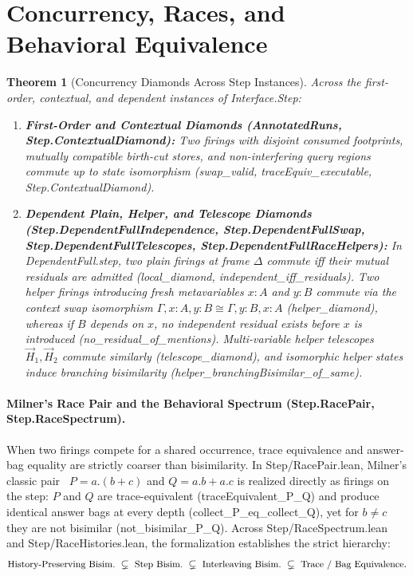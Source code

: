 \documentclass[11pt,a4paper]{article}
\newtheorem{theorem}{Theorem}[section]
\theoremstyle{definition}
\DeclareRobustCommand{\lean}[1]{%
  \ifmmode\text{\normalfont\ttfamily\footnotesize\detokenize{#1}}%
  \else{\normalfont\footnotesize\leanurl{#1}}\fi}
\def\lean#1{#1}%
\begin{document}
\section{Concurrency, Races, and Behavioral Equivalence}
\label{sec:concurrency}

\begin{theorem}[Concurrency Diamonds Across Step Instances]
\label{thm:diamonds}
Across the first-order, contextual, and dependent instances of \lean{Interface.Step}:
\begin{enumerate}[leftmargin=2em, nosep]
  \item \textbf{First-Order and Contextual Diamonds (\lean{AnnotatedRuns}, \lean{Step.ContextualDiamond}):}
  Two firings with disjoint consumed footprints, mutually compatible birth-cut stores, and non-interfering query regions commute up to state isomorphism (\lean{swap_valid}, \lean{traceEquiv_executable}, \lean{Step.ContextualDiamond}).
  \item \textbf{Dependent Plain, Helper, and Telescope Diamonds (\lean{Step.DependentFullIndependence}, \lean{Step.DependentFullSwap}, \lean{Step.DependentFullTelescopes}, \lean{Step.DependentFullRaceHelpers}):}
  In \lean{DependentFull.step}, two plain firings at frame $\Delta$ commute iff their mutual residuals are admitted (\lean{local_diamond}, \lean{independent_iff_residuals}). Two helper firings introducing fresh metavariables $x : A$ and $y : B$ commute via the context swap isomorphism $\Gamma, x:A, y:B \cong \Gamma, y:B, x:A$ (\lean{helper_diamond}), whereas if $B$ depends on $x$, no independent residual exists before $x$ is introduced (\lean{no_residual_of_mentions}). Multi-variable helper telescopes $\vec{H}_1, \vec{H}_2$ commute similarly (\lean{telescope_diamond}), and isomorphic helper states induce branching bisimilarity (\lean{helper_branchingBisimilar_of_same}).
\end{enumerate}
\end{theorem}

\paragraph{Milner's Race Pair and the Behavioral Spectrum (\lean{Step.RacePair}, \lean{Step.RaceSpectrum}).}
When two firings compete for a shared occurrence, trace equivalence and answer-bag equality are strictly coarser than bisimilarity. In \lean{Step/RacePair.lean}, Milner's classic pair~\cite{Milner1980CCS} $P = a.(b + c)$ and $Q = a.b + a.c$ is realized directly as firings on the step: $P$ and $Q$ are trace-equivalent (\lean{traceEquivalent_P_Q}) and produce identical answer bags at every depth (\lean{collect_P_eq_collect_Q}), yet for $b \neq c$ they are not bisimilar (\lean{not_bisimilar_P_Q}). Across \lean{Step/RaceSpectrum.lean} and \lean{Step/RaceHistories.lean}, the formalization establishes the strict hierarchy:
\[
  \text{\small History-Preserving Bisim.} \;\subsetneq\; \text{\small Step Bisim.} \;\subsetneq\; \text{\small Interleaving Bisim.} \;\subsetneq\; \text{\small Trace / Bag Equivalence}.
\]
\end{document}
